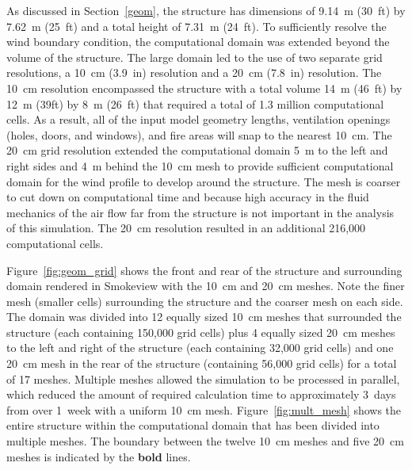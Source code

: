 \documentclass[12pt,oneside]{book}
\begin{document}
As discussed in Section~\ref{geom}, the structure has dimensions of 9.14~m (30~ft) by 7.62~m (25~ft) and a total height of 7.31~m (24~ft). To sufficiently resolve the wind boundary condition, the computational domain was extended beyond the volume of the structure. The large domain led to the use of two separate grid resolutions, a 10~cm (3.9~in) resolution and a 20~cm (7.8~in) resolution. The 10~cm resolution encompassed the structure with a total volume 14~m (46~ft) by 12~m (39ft) by 8~m (26~ft) that required a total of 1.3 million computational cells. As a result, all of the input model geometry lengths, ventilation openings (holes, doors, and windows), and fire areas will snap to the nearest 10~cm. The 20~cm grid resolution extended the computational domain 5~m to the left and right sides and 4~m behind the 10~cm mesh to provide sufficient computational domain for the wind profile to develop around the structure. The mesh is coarser to cut down on computational time and because high accuracy in the fluid mechanics of the air flow far from the structure is not important in the analysis of this simulation. The 20~cm resolution resulted in an additional 216,000 computational cells.

Figure~\ref{fig:geom_grid} shows the front and rear of the structure and surrounding domain rendered in Smokeview with the 10~cm and 20~cm meshes. Note the finer mesh (smaller cells) surrounding the structure and the coarser mesh on each side. The domain was divided into 12 equally sized 10~cm meshes that surrounded the structure (each containing 150,000 grid cells) plus 4 equally sized 20~cm meshes to the left and right of the structure (each containing 32,000 grid cells) and one 20~cm mesh in the rear of the structure (containing 56,000 grid cells) for a total of 17 meshes. Multiple meshes allowed the simulation to be processed in parallel, which reduced the amount of required calculation time to approximately 3~days from over 1~week with a uniform 10~cm mesh. Figure~\ref{fig:mult_mesh} shows the entire structure within the computational domain that has been divided into multiple meshes. The boundary between the twelve 10~cm meshes and five 20~cm meshes is indicated by the {\bf bold} lines.
\end{document}
